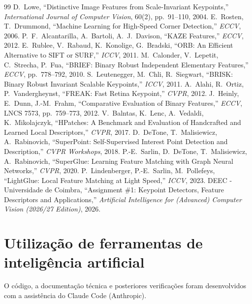 \documentclass[11pt,a4paper]{article}
\begin{document}
\newpage
\begin{thebibliography}{99}
 D.~Lowe, ``Distinctive Image Features from Scale-Invariant Keypoints,''
\emph{International Journal of Computer Vision}, 60(2), pp.~91--110, 2004.
 E.~Rosten, T.~Drummond, ``Machine Learning for High-Speed Corner Detection,''
\emph{ECCV}, 2006.
 P.~F.~Alcantarilla, A.~Bartoli, A.~J.~Davison, ``KAZE Features,''
\emph{ECCV}, 2012.
 E.~Rublee, V.~Rabaud, K.~Konolige, G.~Bradski, ``ORB: An Efficient Alternative to
SIFT or SURF,'' \emph{ICCV}, 2011.
 M.~Calonder, V.~Lepetit, C.~Strecha, P.~Fua, ``BRIEF: Binary Robust Independent
Elementary Features,'' \emph{ECCV}, pp.~778--792, 2010.
 S.~Leutenegger, M.~Chli, R.~Siegwart, ``BRISK: Binary Robust Invariant Scalable
Keypoints,'' \emph{ICCV}, 2011.
 A.~Alahi, R.~Ortiz, P.~Vandergheynst, ``FREAK: Fast Retina Keypoint,'' \emph{CVPR}, 2012.
 J.~Heinly, E.~Dunn, J.-M.~Frahm, ``Comparative Evaluation of Binary Features,''
\emph{ECCV}, LNCS 7573, pp.~759--773, 2012.
 V.~Balntas, K.~Lenc, A.~Vedaldi, K.~Mikolajczyk, ``HPatches: A Benchmark and
Evaluation of Handcrafted and Learned Local Descriptors,'' \emph{CVPR}, 2017.
 D.~DeTone, T.~Malisiewicz, A.~Rabinovich, ``SuperPoint: Self-Supervised Interest Point
Detection and Description,'' \emph{CVPR Workshops}, 2018.
 P.-E.~Sarlin, D.~DeTone, T.~Malisiewicz, A.~Rabinovich, ``SuperGlue: Learning Feature
Matching with Graph Neural Networks,'' \emph{CVPR}, 2020.
 P.~Lindenberger, P.-E.~Sarlin, M.~Pollefeys, ``LightGlue: Local Feature Matching
at Light Speed,'' \emph{ICCV}, 2023.
 DEEC - Universidade de Coimbra, ``Assignment \#1: Keypoint Detectors, Feature Descriptors and Applications,'' \emph{Artificial Intelligence for (Advanced) Computer Vision (2026/27 Edition)}, 2026.
\end{thebibliography}

\appendix

\section{Utilização de ferramentas de inteligência artificial} 
O código, a documentação técnica e posteriores verificações foram desenvolvidos com a assistência do Claude Code (Anthropic).
\end{document}
